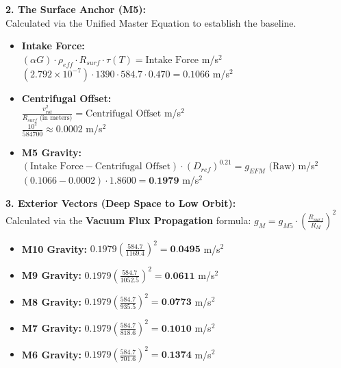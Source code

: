 \documentclass[11pt, a4paper]{article}
\begin{document}
  \vspace{1.0em}
  \noindent \textbf{2. The Surface Anchor (M5):} \\
  \hspace*{1em} Calculated via the Unified Master Equation to establish the baseline.
  \begin{itemize}
    \item \textbf{Intake Force:} \\[0.5em]
    \hspace*{2em} $(\alpha G) \cdot \rho_{eff} \cdot R_{surf} \cdot \tau(T) = \text{Intake Force}$ m/s$^2$ \\[1em]
    \hspace*{2em} $(2.792 \times 10^{-7}) \cdot 1390 \cdot 584.7 \cdot 0.470 = 0.1066$ m/s$^2$
    
    \item \textbf{Centrifugal Offset:} \\[0.5em]
    \hspace*{2em} $\frac{v_{rot}^2}{R_{surf} \text{ (in meters)}} = \text{Centrifugal Offset}$ m/s$^2$ \\[1em]
    \hspace*{2em} $\frac{10^2}{584700} \approx 0.0002$ m/s$^2$
    
    \item \textbf{M5 Gravity:} \\[0.5em]
    \hspace*{2em} $(\text{Intake Force} - \text{Centrifugal Offset}) \cdot (D_{ref})^{0.21} = g_{EFM} \text{ (Raw)}$ m/s$^2$ \\[1em]
    \hspace*{2em} $(0.1066 - 0.0002) \cdot 1.8600 = \textbf{0.1979}$ m/s$^2$
  \end{itemize}

  \clearpage
  \noindent \textbf{3. Exterior Vectors (Deep Space to Low Orbit):} \\
  \hspace*{1em} Calculated via the \textbf{Vacuum Flux Propagation} formula: $g_M = g_{M5} \cdot \left( \frac{R_{surf}}{R_M} \right)^2$
  \begin{itemize}
    \item \textbf{M10 Gravity:} $0.1979 \left( \frac{584.7}{1169.4} \right)^2 = \textbf{0.0495}$ m/s$^2$
    \item \textbf{M9 Gravity:} $0.1979 \left( \frac{584.7}{1052.5} \right)^2 = \textbf{0.0611}$ m/s$^2$
    \item \textbf{M8 Gravity:} $0.1979 \left( \frac{584.7}{935.5} \right)^2 = \textbf{0.0773}$ m/s$^2$
    \item \textbf{M7 Gravity:} $0.1979 \left( \frac{584.7}{818.6} \right)^2 = \textbf{0.1010}$ m/s$^2$
    \item \textbf{M6 Gravity:} $0.1979 \left( \frac{584.7}{701.6} \right)^2 = \textbf{0.1374}$ m/s$^2$
  \end{itemize}
\end{document}
